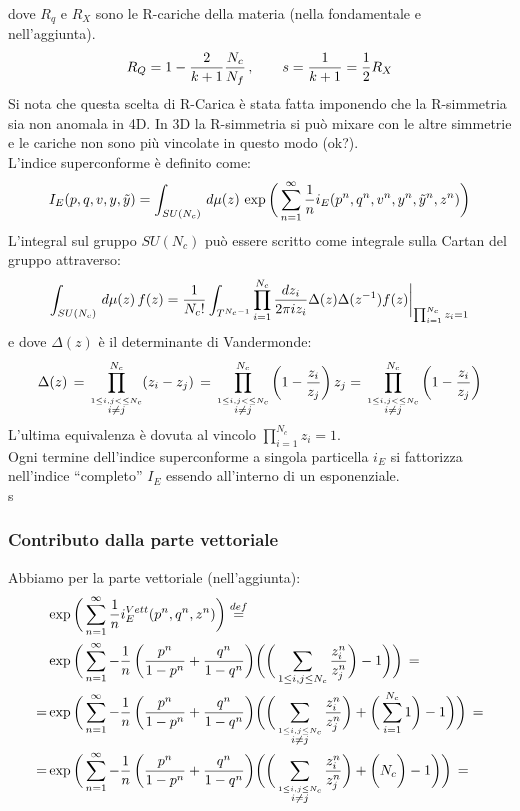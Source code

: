 \documentclass[a4paper,12pt]{article}
\begin{document}
dove $R_q$ e $R_X$ sono le R-cariche della materia (nella fondamentale e nell'aggiunta).
\begin{equation}
R_Q =1-{2\over k+1}{N_c\over N_f} \, , \qquad s = {1 \over k+1} = {1 \over 2 } R_X  \\ 
\end{equation}
Si nota che questa scelta di R-Carica è stata fatta imponendo che la R-simmetria sia non anomala in 4D. In 3D la R-simmetria si può mixare con le altre simmetrie e le cariche non sono più vincolate in questo modo (ok?).\\
 L'indice superconforme è definito come:
 \begin{equation*}
 I_E (p,q,v, y,\tilde y) = \int_{SU(N_c)}\, d \mu(z) \, \exp \bigg( \sum_{n=1}^{\infty} {1 \over n} i_E (p^n,q^n,v^n, y^n,\tilde y^n,z^n) \bigg)
 \end{equation*}
 L'integral sul gruppo $SU(N_c)$ può essere scritto come integrale sulla Cartan del gruppo attraverso:
 \begin{equation}
  \int_{SU(N_c)}\, d \mu(z) \, f(z) = {1 \over N_c!} \int_{T^{N_c-1}} \prod_{i=1}^{N_c } 
  { d z_i \over { 2 \pi i z_i} } \Delta (z) \Delta (z^{-1}) f(z) \bigg \rvert_{\prod_{i=1}^{N_c} z_i = 1} 
 \end{equation}
 e dove $\Delta (z) $ è il determinante di Vandermonde:
 $$
 \Delta (z ) \, = \, \prod_{ \overset{1 \leq i,j< \leq N_c} { i \neq j}}^{N_c} ( z_i - z_j) \, = \,  \prod_{ \overset{1 \leq i,j< \leq N_c} { i \neq j}}^{N_c}\bigg ( 1 - {z_i \over  z_j } \bigg) \, z_j = \,  \prod_{ \overset{1 \leq i,j< \leq N_c} { i \neq j}}^{N_c}\bigg ( 1 - {z_i \over  z_j } \bigg)
 $$
 L'ultima equivalenza è dovuta al vincolo $ \prod_{i=1}^{N_c} z_i = 1$.
 \\
 Ogni termine dell'indice superconforme a singola particella $i_E$ si fattorizza nell'indice ``completo'' $I_E$ essendo all'interno di un esponenziale.\\
s \subsubsection{Contributo dalla parte vettoriale}
 Abbiamo per la parte vettoriale (nell'aggiunta):
 \begin{align*} &\exp \bigg( \sum_{n=1}^{\infty} {1 \over n} i_E^{Vett} (p^n,q^n,z^n) \bigg) \overset{def}{=} \\
 &\exp \bigg( \sum_{n=1}^{\infty} - {1 \over n} \, \bigg( {p^n \over 1-p^n} + {q^n \over 1-q^n} \bigg)  \bigg(\bigg( \sum_{ 1 \leq i,j \leq N_c}  {z_i^n \over z_j^n}  \bigg)- 1 \bigg) \bigg) \, = \\
 =&\exp \bigg( \sum_{n=1}^{\infty} - {1 \over n} \, \bigg( {p^n \over 1-p^n} + {q^n \over 1-q^n} \bigg)  \bigg( \bigg( \sum_{\overset{ 1 \leq i,j \leq N_c}{i \neq j}}  {z_i^n \over z_j^n} \bigg) + \bigg( \sum_{i=1}^{N_c} 1 \bigg)- 1 \bigg) \bigg) \, = \\
  =&\exp \bigg( \sum_{n=1}^{\infty} - {1 \over n} \, \bigg( {p^n \over 1-p^n} + {q^n \over 1-q^n} \bigg)  \bigg( \bigg( \sum_{\overset{ 1 \leq i,j \leq N_c}{i \neq j}}  {z_i^n \over z_j^n} \bigg) + \bigg( N_c \bigg)- 1 \bigg) \bigg) \, = \\
  \end{align*}
\end{document}
